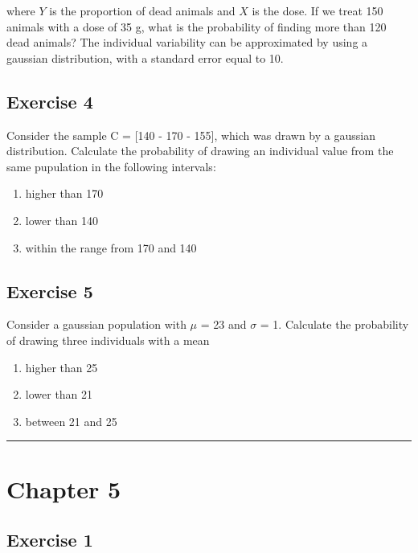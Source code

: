 \documentclass[a4paper,12pt,oneside]{book}
\providecommand{\tightlist}{%
  \setlength{\itemsep}{0pt}\setlength{\parskip}{0pt}}
\begin{document}
where \(Y\) is the proportion of dead animals and \(X\) is the dose. If we treat 150 animals with a dose of 35 g, what is the probability of finding more than 120 dead animals? The individual variability can be approximated by using a gaussian distribution, with a standard error equal to 10.

\hypertarget{exercise-4}{%
\subsection{Exercise 4}\label{exercise-4}}

Consider the sample C = {[}140 - 170 - 155{]}, which was drawn by a gaussian distribution. Calculate the probability of drawing an individual value from the same pupulation in the following intervals:

\begin{enumerate}
\def\labelenumi{\arabic{enumi}.}
\tightlist
\item
  higher than 170
\item
  lower than 140
\item
  within the range from 170 and 140
\end{enumerate}

\hypertarget{exercise-5}{%
\subsection{Exercise 5}\label{exercise-5}}

Consider a gaussian population with \(\mu\) = 23 and \(\sigma\) = 1. Calculate the probability of drawing three individuals with a mean

\begin{enumerate}
\def\labelenumi{\arabic{enumi}.}
\tightlist
\item
  higher than 25
\item
  lower than 21
\item
  between 21 and 25
\end{enumerate}

\begin{center}\rule{0.5\linewidth}{0.5pt}\end{center}

\hypertarget{chapter-5}{%
\section{Chapter 5}\label{chapter-5}}

\hypertarget{exercise-1-2}{%
\subsection{Exercise 1}\label{exercise-1-2}}
\end{document}
